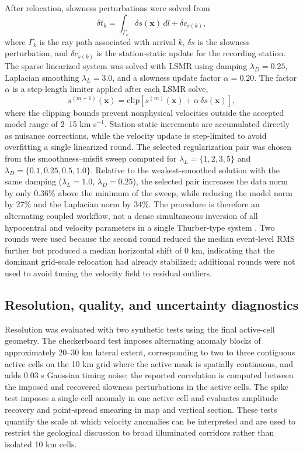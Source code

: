 \documentclass[review,authoryear]{elsarticle}
\begin{document}
After relocation, slowness perturbations were solved from
\begin{equation}
\delta t_k = \int_{\Gamma_k} \delta s(\mathbf{x})\,dl + \delta c_{s(k)} ,
\end{equation}
where $\Gamma_k$ is the ray path associated with arrival $k$, $\delta s$ is the slowness perturbation, and $\delta c_{s(k)}$ is the station-static update for the recording station. The sparse linearized system was solved with LSMR \citep{FongSaunders2011} using damping $\lambda_D=0.25$, Laplacian smoothing $\lambda_L=3.0$, and a slowness update factor $\alpha=0.20$. The factor $\alpha$ is a step-length limiter applied after each LSMR solve,
\begin{equation}
s^{(m+1)}(\mathbf{x})=\mathrm{clip}\left[s^{(m)}(\mathbf{x})+\alpha\,\delta s(\mathbf{x})\right],
\end{equation}
where the clipping bounds prevent nonphysical velocities outside the accepted model range of 2--15 km s$^{-1}$. Station-static increments are accumulated directly as nuisance corrections, while the velocity update is step-limited to avoid overfitting a single linearized round. The selected regularization pair was chosen from the smoothness--misfit sweep computed for $\lambda_L=\{1,2,3,5\}$ and $\lambda_D=\{0.1,0.25,0.5,1.0\}$. Relative to the weakest-smoothed solution with the same damping ($\lambda_L=1.0$, $\lambda_D=0.25$), the selected pair increases the data norm by only 0.36\% above the minimum of the sweep, while reducing the model norm by 27\% and the Laplacian norm by 34\%. The procedure is therefore an alternating coupled workflow, not a dense simultaneous inversion of all hypocentral and velocity parameters in a single Thurber-type system \citep{Crosson1976,Thurber1983}. Two rounds were used because the second round reduced the median event-level RMS further but produced a median horizontal shift of 0 km, indicating that the dominant grid-scale relocation had already stabilized; additional rounds were not used to avoid tuning the velocity field to residual outliers.

\subsection{Resolution, quality, and uncertainty diagnostics}
Resolution was evaluated with two synthetic tests using the final active-cell geometry. The checkerboard test imposes alternating anomaly blocks of approximately 20--30 km lateral extent, corresponding to two to three contiguous active cells on the 10 km grid where the active mask is spatially continuous, and adds 0.03 s Gaussian timing noise; the reported correlation is computed between the imposed and recovered slowness perturbations in the active cells. The spike test imposes a single-cell anomaly in one active cell and evaluates amplitude recovery and point-spread smearing in map and vertical section. These tests quantify the scale at which velocity anomalies can be interpreted and are used to restrict the geological discussion to broad illuminated corridors rather than isolated 10 km cells.
\end{document}
